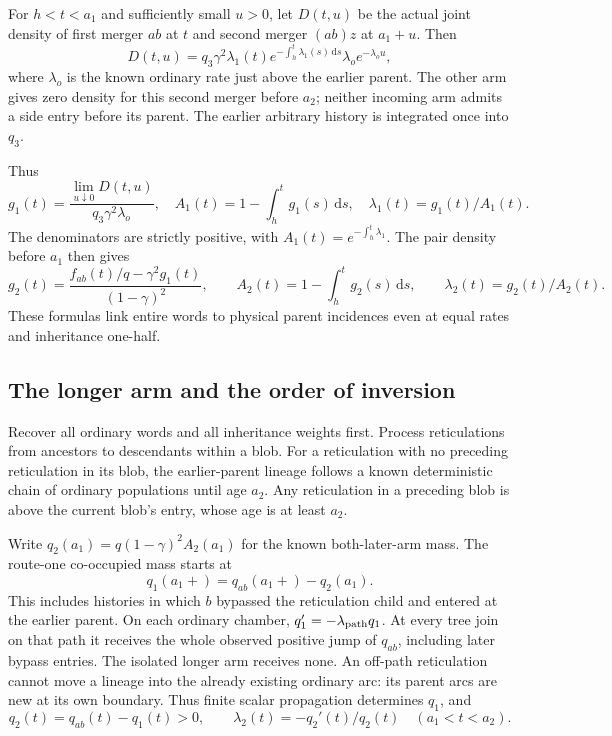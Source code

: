 \documentclass[11pt]{article}
\newcommand{\dd}{\,\mathrm d}
\begin{document}
For $h<t<a_1$ and sufficiently small $u>0$, let $D(t,u)$ be the actual joint density of first merger $ab$ at $t$ and second merger $(ab)z$ at $a_1+u$. Then
\[
 D(t,u)=q_3\gamma^2\lambda_1(t)
 e^{-\int_h^t\lambda_1(s)\dd s}\lambda_o e^{-\lambda_o u},
\]
where $\lambda_o$ is the known ordinary rate just above the earlier parent. The other arm gives zero density for this second merger before $a_2$; neither incoming arm admits a side entry before its parent. The earlier arbitrary history is integrated once into $q_3$.

Thus
\[
 g_1(t)=\frac{\lim_{u\downarrow0}D(t,u)}{q_3\gamma^2\lambda_o},\quad
 A_1(t)=1-\int_h^t g_1(s)\dd s,\quad
 \lambda_1(t)=g_1(t)/A_1(t).
\]
The denominators are strictly positive, with $A_1(t)=e^{-\int_h^t\lambda_1}$. The pair density before $a_1$ then gives
\[
 g_2(t)=\frac{f_{ab}(t)/q-\gamma^2g_1(t)}{(1-\gamma)^2},\qquad
 A_2(t)=1-\int_h^t g_2(s)\dd s,\qquad \lambda_2(t)=g_2(t)/A_2(t).
\]
These formulas link entire words to physical parent incidences even at equal rates and inheritance one-half.

\subsection{The longer arm and the order of inversion}
Recover all ordinary words and all inheritance weights first. Process reticulations from ancestors to descendants within a blob. For a reticulation with no preceding reticulation in its blob, the earlier-parent lineage follows a known deterministic chain of ordinary populations until age $a_2$. Any reticulation in a preceding blob is above the current blob's entry, whose age is at least $a_2$.

Write $q_2(a_1)=q(1-\gamma)^2A_2(a_1)$ for the known both-later-arm mass. The route-one co-occupied mass starts at
\[
 q_1(a_1+)=q_{ab}(a_1+)-q_2(a_1).
\]
This includes histories in which $b$ bypassed the reticulation child and entered at the earlier parent. On each ordinary chamber, $q_1'=-\lambda_{\rm path}q_1$. At every tree join on that path it receives the whole observed positive jump of $q_{ab}$, including later bypass entries. The isolated longer arm receives none. An off-path reticulation cannot move a lineage into the already existing ordinary arc: its parent arcs are new at its own boundary. Thus finite scalar propagation determines $q_1$, and
\[
 q_2(t)=q_{ab}(t)-q_1(t)>0,\qquad
 \lambda_2(t)=-q_2'(t)/q_2(t)\quad(a_1<t<a_2).
\]
\end{document}
